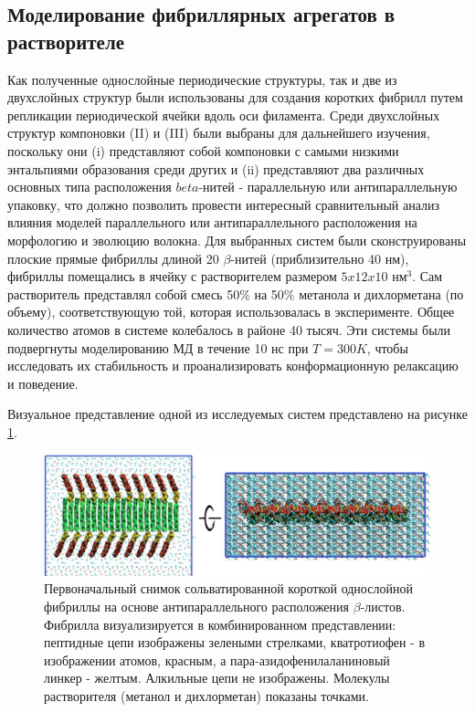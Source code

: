 \subsection{Моделирование фибриллярных агрегатов в растворителе}

    Как полученные однослойные периодические структуры, так и две из двухслойных структур были использованы для создания коротких фибрилл путем репликации периодической ячейки вдоль оси филамента. Среди двухслойных структур компоновки (II) и (III) были выбраны для дальнейшего изучения, поскольку они (i) представляют собой компоновки с самыми низкими энтальпиями образования среди других и (ii) представляют два различных основных типа расположения $beta$-нитей - параллельную или антипараллельную упаковку, что должно позволить провести интересный сравнительный анализ влияния моделей параллельного или антипараллельного расположения на морфологию и эволюцию волокна. Для выбранных систем были сконструированы плоские прямые фибриллы длиной 20 $\beta$-нитей (приблизительно 40 нм), фибриллы помещались в ячейку с растворителем размером $5x12x10$ нм$^3$. Сам растворитель представлял собой смесь 50\% на 50\% метанола и дихлорметана (по объему), соответствующую той, которая использовалась в эксперименте. Общее количество атомов в системе колебалось в районе 40 тысяч. Эти системы были подвергнуты моделированию МД в течение 10 нс при $T=300 K$, чтобы исследовать их стабильность и проанализировать конформационную релаксацию и поведение.

    Визуальное представление одной из исследуемых систем представлено на рисунке \ref{fig:p4_p5_f35}.

\begin{figure} [H]
    \centering
    \includegraphics[width=\textwidth]{images/p4/punkt5/part4_p5_f35.pdf}
    \caption[Первоначальный снимок сольватированной короткой однослойной фибриллы на основе антипараллельного расположения $\beta$-листов]{Первоначальный снимок сольватированной короткой однослойной фибриллы на основе антипараллельного расположения $\beta$-листов. Фибрилла визуализируется в комбинированном представлении: пептидные цепи изображены зелеными стрелками, кватротиофен - в изображении атомов, красным, а пара-азидофенилаланиновый линкер - желтым. Алкильные цепи не изображены. Молекулы растворителя (метанол и дихлорметан) показаны точками.}
    \label{fig:p4_p5_f35}
\end{figure}


